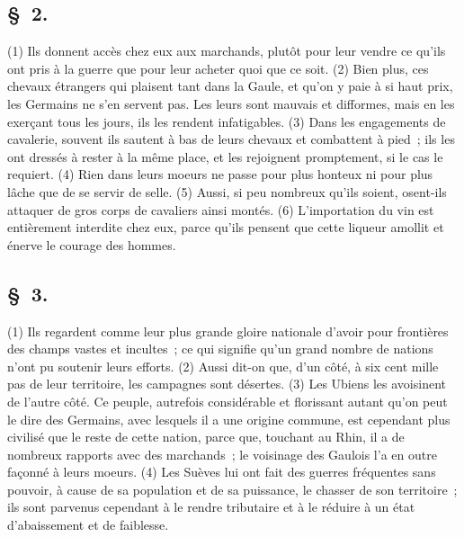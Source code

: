 \documentclass[french,twoside]{book} %
\begin{document}
\subsection[{§ 2.}]{ \textsc{§ 2.} }
\noindent (1) Ils donnent accès chez eux aux marchands, plutôt pour leur vendre ce qu’ils ont pris à la guerre que pour leur acheter quoi que ce soit. (2) Bien plus, ces chevaux étrangers qui plaisent tant dans la Gaule, et qu’on y paie à si haut prix, les Germains ne s’en servent pas. Les leurs sont mauvais et difformes, mais en les exerçant tous les jours, ils les rendent infatigables. (3) Dans les engagements de cavalerie, souvent ils sautent à bas de leurs chevaux et combattent à pied ; ils les ont dressés à rester à la même place, et les rejoignent promptement, si le cas le requiert. (4) Rien dans leurs moeurs ne passe pour plus honteux ni pour plus lâche que de se servir de selle. (5) Aussi, si peu nombreux qu’ils soient, osent-ils attaquer de gros corps de cavaliers ainsi montés. (6) L'importation du vin est entièrement interdite chez eux, parce qu’ils pensent que cette liqueur amollit et énerve le courage des hommes.
\subsection[{§ 3.}]{ \textsc{§ 3.} }
\noindent (1) Ils regardent comme leur plus grande gloire nationale d’avoir pour frontières des champs vastes et incultes ; ce qui signifie qu’un grand nombre de nations n’ont pu soutenir leurs efforts. (2) Aussi dit-on que, d’un côté, à six cent mille pas de leur territoire, les campagnes sont désertes. (3) Les Ubiens les avoisinent de l’autre côté. Ce peuple, autrefois considérable et florissant autant qu’on peut le dire des Germains, avec lesquels il a une origine commune, est cependant plus civilisé que le reste de cette nation, parce que, touchant au Rhin, il a de nombreux rapports avec des marchands ; le voisinage des Gaulois l’a en outre façonné à leurs moeurs. (4) Les Suèves lui ont fait des guerres fréquentes sans pouvoir, à cause de sa population et de sa puissance, le chasser de son territoire ; ils sont parvenus cependant à le rendre tributaire et à le réduire à un état d’abaissement et de faiblesse.
\end{document}
